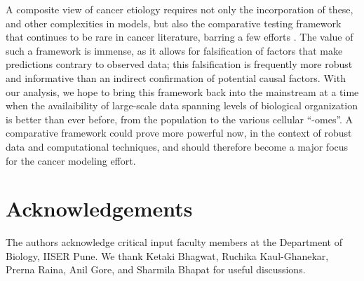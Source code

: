 \documentclass[12pt,onecolumn,twoside]{article}
\begin{document}
A composite view of cancer etiology requires not only the incorporation of these, and other complexities in models, but also the comparative testing framework that continues to be rare in cancer literature, barring a few efforts \autocite{Frank2007}. The value of such a framework is immense, as it allows for falsification of factors that make predictions contrary to observed data; this falsification is frequently more robust and informative than an indirect confirmation of potential causal factors. With our analysis, we hope to bring this framework back into the mainstream at a time when the availaibility of large-scale data spanning levels of biological organization is better than ever before, from the population to the various cellular ``-omes''. A comparative framework could prove more powerful now, in the context of robust data and computational techniques, and should therefore become a major focus for the cancer modeling effort.

\section*{Acknowledgements}
The authors acknowledge critical input faculty members at the Department of Biology, IISER Pune. We thank Ketaki Bhagwat, Ruchika Kaul-Ghanekar, Prerna Raina, Anil Gore, and Sharmila Bhapat for useful discussions.

\printbibliography
\end{document}
